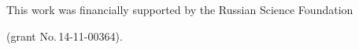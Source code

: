 




\vspace*{-9pt}





\Ack


\noindent


This work was financially supported by the Russian Science Foundation 


(grant No.\,14-11-00364).
















